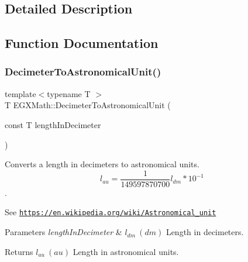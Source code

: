 \subsection{Detailed Description}


\subsection{Function Documentation}
\mbox{\label{group___e_g_x_math-_conversions-_length_conversions-_decimeter-_astronomical_ga9cf39545f022d3a541668e644347b2f8}} 
\subsubsection{\texorpdfstring{Decimeter\+To\+Astronomical\+Unit()}{DecimeterToAstronomicalUnit()}}
{\footnotesize\ttfamily template$<$typename T $>$ \\
T E\+G\+X\+Math\+::\+Decimeter\+To\+Astronomical\+Unit (\begin{DoxyParamCaption}\item[{const T}]{length\+In\+Decimeter }\end{DoxyParamCaption})}



Converts a length in decimeters to astronomical units. \[ l_{au}= \frac{1}{149597870700} l_{dm} * 10^{-1} \]. 

See \href{https://en.wikipedia.org/wiki/Astronomical_unit}{\tt https\+://en.\+wikipedia.\+org/wiki/\+Astronomical\+\_\+unit} 
\begin{DoxyParams}{Parameters}
{\em length\+In\+Decimeter} & $ l_{dm}\ (dm)$ Length in decimeters. \\
\hline
\end{DoxyParams}
\begin{DoxyReturn}{Returns}
$ l_{au}\ (au)$ Length in astronomical units. 
\end{DoxyReturn}
\mbox{\label{group___e_g_x_math-_conversions-_length_conversions-_decimeter-_astronomical_ga2dedea5304a0dbcba4efa1128eda42d2}} 
